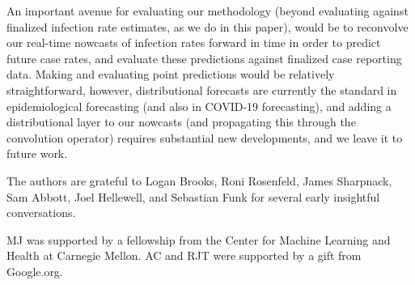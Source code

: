 \documentclass[sts]{imsart}
\theoremstyle{plain}
\theoremstyle{definition}
\theoremstyle{remark}
\begin{document}
An important avenue for evaluating our methodology (beyond evaluating against
finalized infection rate estimates, as we do in this paper), would be to
reconvolve our real-time nowcasts of infection rates forward in time in order to
predict future case rates, and evaluate these predictions against finalized case
reporting data. Making and evaluating point predictions would be relatively
straightforward, however, distributional forecasts are currently the standard in
epidemiological forecasting (and also in COVID-19 forecasting), and adding a
distributional layer to our nowcasts (and propagating this through the
convolution operator) requires substantial new developments, and we leave it to
future work.

\begin{acks}[Acknowledgments]
The authors are grateful to Logan Brooks, Roni Rosenfeld, James Sharpnack, Sam 
Abbott, Joel Hellewell, and Sebastian Funk for several early insightful
conversations.   
 
MJ was supported by a fellowship from the Center for Machine Learning and 
Health at Carnegie Mellon. AC and RJT were supported by a gift from Google.org.   
\end{acks}


\end{document}
